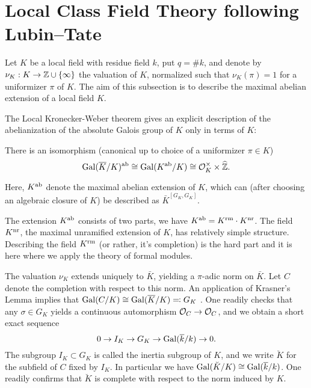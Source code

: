 \documentclass[../main.tex]{subfiles}
\begin{document}
\section{Local Class Field Theory following Lubin--Tate} %
\label{sec:Local Class Field Theory}
Let $K$ be a local field with residue field $k$, put $q = \# k$, and 
denote by $\nu_K: K \to \mathbb{Z} \cup \{\infty\}$ the valuation of $K$, normalized
such that $\nu_K(\pi) = 1$ for a uniformizer $\pi$ of $K$.
The aim of this subsection is to describe the maximal abelian extension of
a local field $K$.

The Local Kronecker-Weber theorem gives an explicit description of the
abelianization of the absolute Galois group of $K$ only in terms of $K$:

\begin{thm}\label{thm:localKW}
  There is an isomorphism (canonical up to choice of a uniformizer 
  $\pi \in K$)
  \begin{equation*}
    \operatorname{Gal}(\overline K/K)^{\mathrm{ab}} \cong \operatorname{Gal}(K^{\mathrm{ab}}/K) \cong \mathcal{O}_K^\times
    \times \widehat {\mathbb{Z}}.
  \end{equation*}
\end{thm}
Here, $K^{\mathrm{ab}}$ denote the maximal abelian extension of $K$, which can (after choosing
an algebraic closure of $K$) be described as $\bar K^{[G_K, G_K]}$. 

The extension $K^{\mathrm{ab}}$ consists of two parts, we have 
$K^{\mathrm{ab}} = K^{\mathrm{rm}} \cdot K^{\mathrm{nr}}$. The field $K^{\mathrm{nr}}$, the maximal unramified extension
of $K$, has relatively simple structure. 
Describing the field $K^{\mathrm{rm}}$ (or rather, it's completion) is the hard part and
it is here where we apply the theory of formal modules.

The valuation $\nu_K$ extends uniquely to $\bar K$, yielding a
$\pi$-adic norm on $\bar K$. Let $C$ denote the completion with respect to this
norm. An application of Krasner's Lemma implies that $\operatorname{Gal}(C/K) \cong \operatorname{Gal}(\overline
K/K) \eqqcolon G_K$
. One readily checks that any $\sigma \in G_K$ yields a 
continuous automorphism $\mathcal{O}_C \to \mathcal{O}_C$, and we obtain a short exact sequence 
\begin{equation*}
  0 \to I_K \to G_K \to \operatorname{Gal}(\overline k /k) \to 0.
\end{equation*}
The subgroup $I_K \subset G_K$ is called the inertia subgroup of $K$,
and we write $\breve K$ for the subfield of $C$ fixed by $I_K$. In particular
we have $\operatorname{Gal}(\breve K /K) \cong \operatorname{Gal}(\overline k /k)$. One readily confirms that 
$\breve K$ is complete with respect to the norm induced by $K$. 
\end{document}
